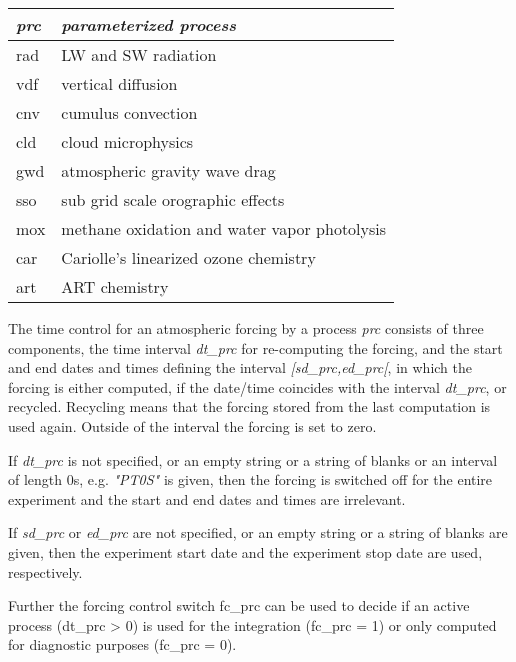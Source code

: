 \begin{table}[htbp]
\begin{center}
\begin{tabular}{l|l}
\textit{prc} & \textit{parameterized process} \\
\hline
rad & LW and SW radiation \\
vdf & vertical diffusion \\
cnv & cumulus convection \\
cld & cloud microphysics \\
gwd & atmospheric gravity wave drag \\
sso & sub grid scale orographic effects \\
mox & methane oxidation and water vapor photolysis \\
car & Cariolle's linearized ozone chemistry \\
art & ART chemistry \\
\end{tabular}
\end{center}
\label{default}
\end{table}%

The time control for an atmospheric forcing by a process \textit{prc} consists of three components, the time interval \textit{dt\_prc} for re-computing the forcing, and the start and end dates and times defining the interval \textit{[sd\_prc,ed\_prc[}, in which the forcing is either computed, if the date/time coincides with the interval \textit{dt\_prc}, or recycled. Recycling means that the forcing stored from the last computation is used again. Outside of the interval the forcing is set to zero.

If \textit{dt\_prc} is not specified, or an empty string or a string of blanks or an interval of length 0s, e.g. \textit{"PT0S"} is given, then the forcing is switched off for the entire experiment and the start and end dates and times are irrelevant.

If \textit{sd\_prc} or \textit{ed\_prc} are not specified, or an empty string or a string of blanks are given, then the experiment start date and the experiment stop date are used, respectively.

Further the forcing control switch fc\_prc can be used to decide if an active process (dt\_prc > 0) is used for the integration (fc\_prc = 1) or only computed for diagnostic purposes (fc\_prc = 0).

